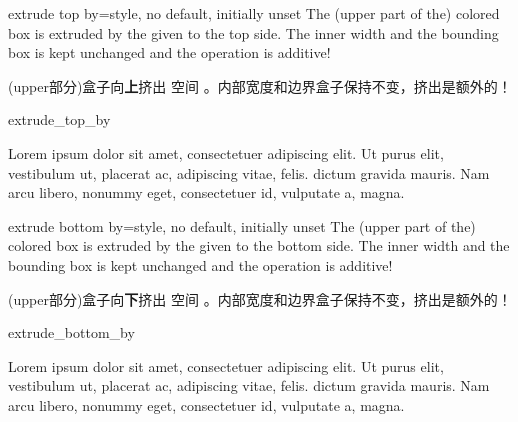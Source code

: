 \begin{docTcbKey}{extrude top by}{=}{style, no default, initially unset}
The (upper part of the) colored box is extruded by the given  to the top side.
The inner width and the bounding box is kept unchanged and the operation
is additive!

(upper部分)盒子向{\bf 上}挤出  空间%
。内部宽度和边界盒子保持不变，挤出是额外的！
\begin{exdispExample}{extrude_top_by}

Lorem ipsum dolor sit amet, consectetuer adipiscing elit. Ut purus elit,
vestibulum ut, placerat ac, adipiscing vitae, felis.
 dictum gravida mauris.
Nam arcu libero, nonummy eget, consectetuer id, vulputate a, magna.
\end{exdispExample}
\end{docTcbKey}

\begin{docTcbKey}{extrude bottom by}{=}{style, no default, initially unset}
The (upper part of the) colored box is extruded by the given  to the bottom side.
The inner width and the bounding box is kept unchanged and the operation
is additive!

(upper部分)盒子向{\bf 下}挤出  空间%
。内部宽度和边界盒子保持不变，挤出是额外的！
\begin{exdispExample}[safety=1cm]{extrude_bottom_by}

Lorem ipsum dolor sit amet, consectetuer adipiscing elit. Ut purus elit,
vestibulum ut, placerat ac, adipiscing vitae, felis.
 dictum gravida mauris.
Nam arcu libero, nonummy eget, consectetuer id, vulputate a, magna.
\end{exdispExample}
\end{docTcbKey}



